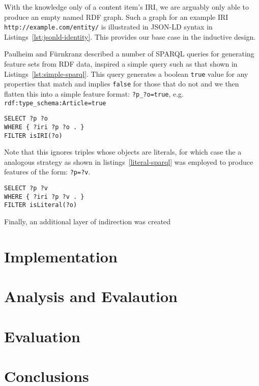 \documentclass{sig-alternate-05-2015}
\begin{document}
With the knowledge only of a content item's IRI, we are arguably only able to
produce an empty named RDF graph. Such a graph for an example IRI
\texttt{http://example.com/entity/} is illustrated in
JSON-LD syntax in Listings~\ref{lst:jsonld-identity}. This provides our
base case in the inductive design.

Paulheim and F\"urnkranz\cite{paulheim2012unsupervised} described a number of
SPARQL queries for generating feature sets from RDF data, inspired
a simple query such as that shown in Listings~\ref{lst:simple-sparql}. This
query generates a boolean \texttt{true} value for any properties that match
and implies \texttt{false} for those that do not and we then flatten this into
a simple feature format: \texttt{?p\_?o=true},
e.g. \texttt{rdf:type\_schema:Article=true}

\begin{lstlisting}[label=lst:simple-sparql,caption={Generates field \texttt{content\_?p\_?v} with value \texttt{true}},language=sparql]
SELECT ?p ?o
WHERE { ?iri ?p ?o . }
FILTER isIRI(?o)
\end{lstlisting}

Note that this ignores triples whose objects are literals, for which case the
a analogous strategy as shown in listings~\ref{literal-sparql} was employed to
produce features of the form: \texttt{?p=?v}.

\begin{lstlisting}[label=lst:literal-sparql,caption={Generates field \texttt{content\_?p\_?v} with value \texttt{true}},language=sparql]
SELECT ?p ?v
WHERE { ?iri ?p ?v . }
FILTER isLiteral(?o)
\end{lstlisting}

Finally, an additional layer of indirection was created

\section{Implementation}

\section{Analysis and Evalaution}

\section{Evaluation}

\section{Conclusions}

%
%
\end{document}

